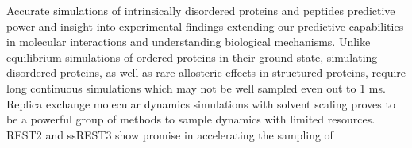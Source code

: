 Accurate simulations of intrinsically disordered proteins and peptides  predictive power and insight into experimental findings extending our predictive capabilities in molecular interactions and understanding biological mechanisms. 
Unlike equilibrium simulations of ordered proteins in their ground state, simulating disordered proteins, as well as rare allosteric effects in structured proteins, require long continuous simulations which may not be well sampled even out to 1 ms. 
Replica exchange molecular dynamics simulations with solvent scaling proves to be a powerful group of methods to sample dynamics with limited resources. 
REST2 and ssREST3 show promise in accelerating the sampling of